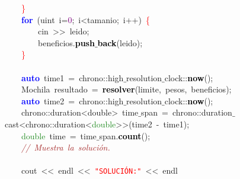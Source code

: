 \mbox{}\ \ \ \ \textcolor{Red}{\}} \\
\mbox{}\ \ \ \ \textbf{\textcolor{Blue}{for}}\ \textcolor{BrickRed}{(}\textcolor{TealBlue}{uint}\ i\textcolor{BrickRed}{=}\textcolor{Purple}{0}\textcolor{BrickRed}{;}\ i\textcolor{BrickRed}{\textless{}}tamanio\textcolor{BrickRed}{;}\ i\textcolor{BrickRed}{++)}\ \textcolor{Red}{\{} \\
\mbox{}\ \ \ \ \ \ \ \ cin\ \textcolor{BrickRed}{\textgreater{}\textgreater{}}\ leido\textcolor{BrickRed}{;} \\
\mbox{}\ \ \ \ \ \ \ \ beneficios\textcolor{BrickRed}{.}\textbf{\textcolor{Black}{push$\_$back}}\textcolor{BrickRed}{(}leido\textcolor{BrickRed}{);} \\
\mbox{}\ \ \ \ \textcolor{Red}{\}} \\
\mbox{}\ \ \ \  \\
\mbox{}\ \ \ \ \textbf{\textcolor{Blue}{auto}}\ time1\ \textcolor{BrickRed}{=}\ chrono\textcolor{BrickRed}{::}high$\_$resolution$\_$clock\textcolor{BrickRed}{::}\textbf{\textcolor{Black}{now}}\textcolor{BrickRed}{();} \\
\mbox{}\ \ \ \ \textcolor{TealBlue}{Mochila}\ resultado\ \textcolor{BrickRed}{=}\ \textbf{\textcolor{Black}{resolver}}\textcolor{BrickRed}{(}limite\textcolor{BrickRed}{,}\ pesos\textcolor{BrickRed}{,}\ beneficios\textcolor{BrickRed}{);} \\
\mbox{}\ \ \ \ \textbf{\textcolor{Blue}{auto}}\ time2\ \textcolor{BrickRed}{=}\ chrono\textcolor{BrickRed}{::}high$\_$resolution$\_$clock\textcolor{BrickRed}{::}\textbf{\textcolor{Black}{now}}\textcolor{BrickRed}{();} \\
\mbox{}\ \ \ \ chrono\textcolor{BrickRed}{::}\textcolor{TealBlue}{duration\textless{}double\textgreater{}}\ time$\_$span\ \textcolor{BrickRed}{=}\ chrono\textcolor{BrickRed}{::}duration$\_$cast\textcolor{BrickRed}{\textless{}}chrono\textcolor{BrickRed}{::}duration\textcolor{BrickRed}{\textless{}}\textcolor{ForestGreen}{double}\textcolor{BrickRed}{\textgreater{}\textgreater{}(}time2\ \textcolor{BrickRed}{-}\ time1\textcolor{BrickRed}{);} \\
\mbox{}\ \ \ \ \textcolor{ForestGreen}{double}\ time\ \textcolor{BrickRed}{=}\ time$\_$span\textcolor{BrickRed}{.}\textbf{\textcolor{Black}{count}}\textcolor{BrickRed}{();} \\
\mbox{}\ \ \ \ \textit{\textcolor{Brown}{//\ Muestra\ la\ solución.}} \\
\mbox{}\ \ \ \  \\
\mbox{}\ \ \ \ cout\ \textcolor{BrickRed}{\textless{}\textless{}}\ endl\ \textcolor{BrickRed}{\textless{}\textless{}}\ \texttt{\textcolor{Red}{"{}SOLUCIÓN:"{}}}\ \textcolor{BrickRed}{\textless{}\textless{}}\ endl\  \\
